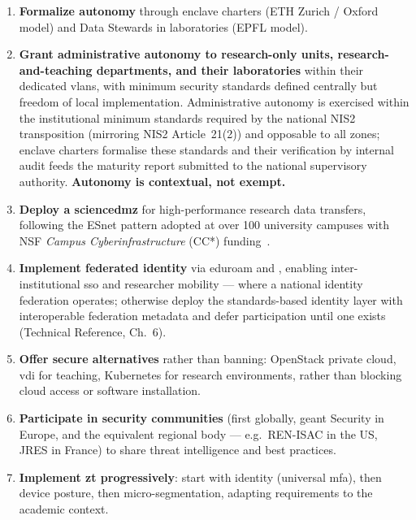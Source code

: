 \begin{enumerate}
    \item \textbf{Formalize autonomy} through enclave charters
    (ETH Zurich / Oxford model) and Data Stewards in
    laboratories (EPFL model).

    \item \textbf{Grant administrative autonomy to research-only units,
    research-and-teaching departments, and their laboratories} within
    their dedicated \gls{vlan}s, with minimum security standards defined
    centrally but freedom of local implementation. Administrative
    autonomy is exercised within the institutional minimum standards
    required by the national NIS2 transposition (mirroring NIS2
    Article~21(2)) and opposable to
    all zones; enclave charters formalise these standards and their
    verification by internal audit feeds the maturity report
    submitted to the national supervisory authority. \textbf{Autonomy
    is contextual, not exempt.}

    \item \textbf{Deploy a \gls{sciencedmz}} for high-performance research
    data transfers, following the ESnet pattern adopted at over 100
    university campuses with NSF \emph{Campus Cyberinfrastructure} (CC*) funding~\cite{esnet-history,nsf-cc}.

    \item \textbf{Implement federated identity} via
    \gls{eduroam} and , enabling inter-institutional
    \gls{sso} and researcher mobility --- where a national identity
    federation operates; otherwise deploy the standards-based
    identity layer with interoperable federation metadata and defer
    participation until one exists (Technical Reference, Ch.~6).

    \item \textbf{Offer secure alternatives} rather than
    banning: OpenStack private cloud, \gls{vdi} for teaching,
    Kubernetes for research environments, rather than
    blocking cloud access or software installation.

    \item \textbf{Participate in security communities} (\gls{first}
    globally, \gls{geant} Security in Europe, and the equivalent regional
    body --- e.g.\ REN-ISAC in the US, JRES in France) to share threat
    intelligence and best practices.

    \item \textbf{Implement \gls{zt} progressively}:
    start with identity (universal \gls{mfa}), then device
    posture, then micro-segmentation, adapting requirements
    to the academic context.


\end{enumerate}
